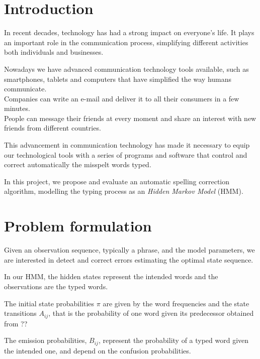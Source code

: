\chapter{Introduction}
\label{chap:Introduction}

In recent decades, technology has had a strong impact on everyone's life.
It plays an important role in the communication process, simplifying 
different activities both individuals and businesses.

Nowadays we have advanced communication technology tools available, 
such as smartphones, tablets and computers that have simplified the way 
humans communicate. \\
Companies can write an e-mail and deliver it to all their consumers in a few 
minutes. \\
People can message their friends at every moment and share an interest 
with new friends from different countries.

This advancement in communication technology has made it necessary to 
equip our technological tools with a series of programs and software that 
control and correct automatically the misspelt words typed.

In this project, we propose and evaluate an automatic spelling correction 
algorithm, modelling the typing process as an \textit{Hidden Markov 
Model} (HMM). 




\chapter{Problem formulation} %
Given an observation sequence, typically a phrase, and the model 
parameters, we are interested in detect and correct errors estimating the 
optimal state sequence. %

In our HMM, the hidden states represent the intended words and the 
observations are the typed words. 

The initial state probabilities $\pi$ are given by the word frequencies and 
the state transitions $A_{ij}$, that is the probability of one word given 
its predecessor obtained from ?? %

The emission probabilities, $B_{ij}$, represent the probability of a typed 
word given the intended one, and depend on the confusion probabilities.


